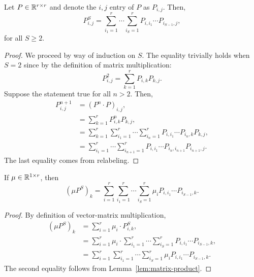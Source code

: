\begin{lemma}\label{lem:matrix-product}
    Let $P \in \mathbb{R}^{r\times r}$ and denote the $i,j$ entry of $P$ as $P_{i,j}$. Then, 
    \[
        P^S_{i,j} = \sum_{i_1=1}^r \cdots \sum_{i_S=1}^r P_{i,i_1} \cdots P_{i_{S-1},j},
    \]
    for all $S \geq 2$. 
\end{lemma}
\begin{proof}
    We proceed by way of induction on $S$. The equality trivially holds when $S=2$ since by the definition of matrix multiplication:
    \[
        P^2_{i,j} = \sum_{k=1}^r P_{i,k}P_{k,j}.    
    \] 
    Suppose the statement true for all $n>2$. Then, 
    \begin{align*}
        P^{n+1}_{i,j} &= (P^n\cdot P)_{i,j}, \\
        &= \sum_{k=1}^r P^n_{i,k}P_{k,j}, \\
        &= \sum_{k=1}^r \sum_{i_1=1}^r\cdots \sum_{i_n=1}^r P_{i,i_1}\cdots P_{i_n,k} P_{k,j}, \\
        &= \sum_{i_1=1}^r\cdots \sum_{i_{n+1}=1}^r P_{i,i_1} \cdots P_{i_n,i_{n+1}}P_{i_{n+1},j}.
    \end{align*}
    The last equality comes from relabeling.
\end{proof}
\begin{corollary}\label{cor:initial-dist}
    If $\mu \in \mathbb{R}^{1\times r}$, then 
    \[
        (\mu P^S)_k = \sum_{i=1}^r \sum_{i_1=1}^r \cdots \sum_{i_S=1}^r \mu_i  P_{i,i_1} \cdots P_{i_{S-1},k}.
    \]
\end{corollary}
\begin{proof}
    By definition of vector-matrix multiplication, 
    \begin{align*}
        (\mu P^S)_k &= \sum_{i=1}^r \mu_i\cdot P_{i,k}^S, \\ 
        &= \sum_{i=1}^r \mu_i \cdot \sum_{i_1=1}^r \cdots \sum_{i_S=1}^r P_{i,i_1} \cdots P_{i_{S-1},k},  \\
        &=\sum_{i=1}^r \sum_{i_1=1}^r \cdots \sum_{i_S=1}^r \mu_i  P_{i,i_1} \cdots P_{i_{S-1},k}.
    \end{align*}
    The second equality follows from Lemma~\ref{lem:matrix-product}.
\end{proof}